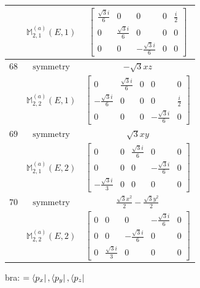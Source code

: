 \documentclass[fleqn,8pt,landscape]{jsarticle}
\begin{document}
\begin{longtable}{ccc}
$  $ & $ \mathbb{M}_{2,1}^{(a)}(E,1) $ & $ \begin{bmatrix} \frac{\sqrt{3} i}{6} & 0 & 0 & 0 & \frac{i}{2} \\ 0 & \frac{\sqrt{3} i}{6} & 0 & 0 & 0 \\ 0 & 0 & - \frac{\sqrt{3} i}{6} & 0 & 0 \end{bmatrix} $ \\ \hline
$ 68 $ & $ \text{symmetry} $ & $ - \sqrt{3} x z $ \\
$  $ & $ \mathbb{M}_{2,2}^{(a)}(E,1) $ & $ \begin{bmatrix} 0 & \frac{\sqrt{3} i}{6} & 0 & 0 & 0 \\ - \frac{\sqrt{3} i}{6} & 0 & 0 & 0 & \frac{i}{2} \\ 0 & 0 & 0 & - \frac{\sqrt{3} i}{6} & 0 \end{bmatrix} $ \\ \hline
$ 69 $ & $ \text{symmetry} $ & $ \sqrt{3} x y $ \\
$  $ & $ \mathbb{M}_{2,1}^{(a)}(E,2) $ & $ \begin{bmatrix} 0 & 0 & \frac{\sqrt{3} i}{6} & 0 & 0 \\ 0 & 0 & 0 & - \frac{\sqrt{3} i}{6} & 0 \\ - \frac{\sqrt{3} i}{3} & 0 & 0 & 0 & 0 \end{bmatrix} $ \\ \hline
$ 70 $ & $ \text{symmetry} $ & $ \frac{\sqrt{3} x^{2}}{2} - \frac{\sqrt{3} y^{2}}{2} $ \\
$  $ & $ \mathbb{M}_{2,2}^{(a)}(E,2) $ & $ \begin{bmatrix} 0 & 0 & 0 & - \frac{\sqrt{3} i}{6} & 0 \\ 0 & 0 & - \frac{\sqrt{3} i}{6} & 0 & 0 \\ 0 & \frac{\sqrt{3} i}{3} & 0 & 0 & 0 \end{bmatrix} $ \\ \hline
\end{longtable}
bra: $=\bra{p_{x}}, \bra{p_{y}}, \bra{p_{z}}$
\end{document}
